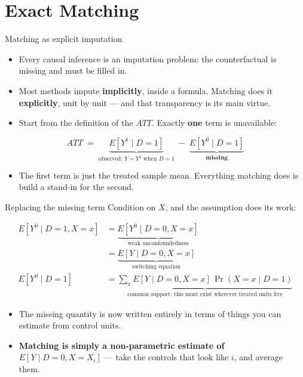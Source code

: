 \documentclass[
  11pt,
  ignorenonframetext,
  aspectratio=169,
]{beamer}
\providecommand{\tightlist}{%
  \setlength{\itemsep}{0pt}\setlength{\parskip}{0pt}}
\begin{document}
\section{Exact Matching}\label{exact-matching}

\begin{frame}{Matching as explicit imputation}
\protect{}\label{matching-as-explicit-imputation}
\begin{itemize}
\tightlist
\item
  Every causal inference is an imputation problem: the counterfactual is
  missing and must be filled in.
\item
  Most methods impute \textbf{implicitly}, inside a formula. Matching
  does it \textbf{explicitly}, unit by unit --- and that transparency is
  its main virtue.
\item
  Start from the definition of the \(ATT\). Exactly \textbf{one} term is
  unavailable:
\end{itemize}

\[
ATT \;=\; \underbrace{E[Y^1 \mid D{=}1]}_{\text{observed: } Y = Y^1 \text{ when } D=1}
\;-\; \underbrace{E[Y^0 \mid D{=}1]}_{\textbf{missing}}
\]

\begin{itemize}
\tightlist
\item
  The first term is just the treated sample mean. Everything matching
  does is build a stand-in for the second.
\end{itemize}
\end{frame}

\begin{frame}{Replacing the missing term}
\protect{}\label{replacing-the-missing-term}
Condition on \(X\), and the assumption does its work:

\[
\begin{aligned}
E[Y^0 \mid D{=}1, X{=}x]
  &= \underbrace{E[Y^0 \mid D{=}0, X{=}x]}_{\text{weak unconfoundedness}} \\[0.2em]
  &= \underbrace{E[Y \mid D{=}0, X{=}x]}_{\text{switching equation}} \\[0.4em]
E[Y^0 \mid D{=}1]
  &= \underbrace{\sum_x E[Y \mid D{=}0, X{=}x]\,\Pr(X{=}x \mid D{=}1)}_{\text{common support: this must exist wherever treated units live}}
\end{aligned}
\]

\begin{itemize}
\tightlist
\item
  The missing quantity is now written entirely in terms of things you
  can estimate from control units.
\item
  \textbf{Matching is simply a non-parametric estimate of
  \(E[Y \mid D{=}0, X{=}X_i]\)} --- take the controls that look like
  \(i\), and average them.
\end{itemize}
\end{frame}
\end{document}

